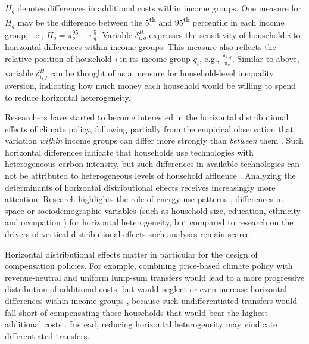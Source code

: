 \documentclass[12pt, a4paper]{article}
\begin{document}
$H_{q}$ denotes differences in additional costs within income groups. One measure for $H_{q}$ may be the difference between the 5\textsuperscript{th} and 95\textsuperscript{th} percentile in each income group, i.e., $H_{q}=\pi_{q}^{95}-\pi_{q}^{5}$. Variable $\delta_{i,q}^{H}$ expresses the sensitivity of household \textit{i} to horizontal differences within income groups. This measure also reflects the relative position of household \textit{i} in its income group $q_{i}$, e.g., $\frac{\pi_{i,q}}{\overline{\pi_{q}}}$. Similar to above, variable $\delta_{i,q}^{H}$ can be thought of as a measure for household-level inequality aversion, indicating how much money each household would be willing to spend to reduce horizontal heterogeneity.

Researchers have started to become interested in the horizontal distributional effects of climate policy, following partially from the empirical observation that variation \textit{within} income groups can differ more strongly than \textit{between} them \autocite{Cronin.2019,Steckel.2021b,Pizer.2019}. Such horizontal differences indicate that households use technologies with heterogeneous carbon intensity, but such differences in available technologies can not be attributed to heterogeneous levels of household affluence \autocite{Hansel.2022}. Analyzing the determinants of horizontal distributional effects receives increasingly more attention: Research highlights the role of energy use patterns \autocite{Steckel.2021b,Missbach.2024}, differences in space \autocite{Chan.2023,Burtraw.2009} or sociodemographic variables (such as household size, education, ethnicity and occupation \autocite{Grainger.2010,Buchs.2013,Farrell.2017,Missbach.2023,Fremstad.2019}) for horizontal heterogeneity, but compared to research on the drivers of vertical distributional effects such analyses remain scarce.

Horizontal distributional effects matter in particular for the design of compensation policies. For example, combining price-based climate policy with revenue-neutral and uniform lump-sum transfers would lead to a more progressive distribution of additional costs, but would neglect or even increase horizontal differences within income groups \autocite{Cronin.2019,Hansel.2022}, because such undifferentiated transfers would fall short of compensating those households that would bear the highest additional costs \autocite{Fullerton.2019,Missbach.2024,Sallee.2019}. Instead, reducing horizontal heterogeneity may vindicate differentiated transfers.
\end{document}
